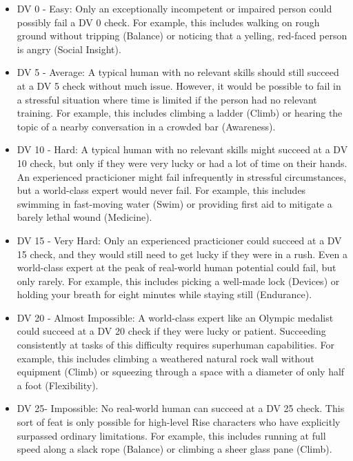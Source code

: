     \begin{itemize}
      \item DV 0 - Easy: Only an exceptionally incompetent or impaired person could possibly fail a DV 0 check. For example, this includes walking on rough ground without tripping (Balance) or noticing that a yelling, red-faced person is angry (Social Insight).
      \item DV 5 - Average: A typical human with no relevant skills should still succeed at a DV 5 check without much issue. However, it would be possible to fail in a stressful situation where time is limited if the person had no relevant training. For example, this includes climbing a ladder (Climb) or hearing the topic of a nearby conversation in a crowded bar (Awareness).
      \item DV 10 - Hard: A typical human with no relevant skills might succeed at a DV 10 check, but only if they were very lucky or had a lot of time on their hands. An experienced practicioner might fail infrequently in stressful circumstances, but a world-class expert would never fail. For example, this includes swimming in fast-moving water (Swim) or providing first aid to mitigate a barely lethal wound (Medicine).
      \item DV 15 - Very Hard: Only an experienced practicioner could succeed at a DV 15 check, and they would still need to get lucky if they were in a rush. Even a world-class expert at the peak of real-world human potential could fail, but only rarely. For example, this includes picking a well-made lock (Devices) or holding your breath for eight minutes while staying still (Endurance).
      \item DV 20 - Almost Impossible: A world-class expert like an Olympic medalist could succeed at a DV 20 check if they were lucky or patient. Succeeding consistently at tasks of this difficulty requires superhuman capabilities. For example, this includes climbing a weathered natural rock wall without equipment (Climb) or squeezing through a space with a diameter of only half a foot (Flexibility).
      \item DV 25\add - Impossible: No real-world human can succeed at a DV 25 check. This sort of feat is only possible for high-level Rise characters who have explicitly surpassed ordinary limitations. For example, this includes running at full speed along a slack rope (Balance) or climbing a sheer glass pane (Climb).
    \end{itemize}

